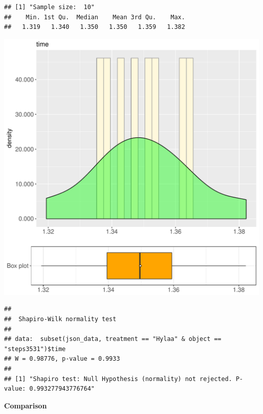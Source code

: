 \documentclass{article}\usepackage[]{graphicx}\usepackage[]{color}
\makeatletter
\def\maxwidth{ %
  \ifdim\Gin@nat@width>\linewidth
    \linewidth
  \else
    \Gin@nat@width
  \fi
}
\newenvironment{kframe}{%
 \def\at@end@of@kframe{}%
 \ifinner\ifhmode%
  \def\at@end@of@kframe{\end{minipage}}%
  \begin{minipage}{\columnwidth}%
 \fi\fi%
 \def\FrameCommand##1{\hskip\@totalleftmargin \hskip-\fboxsep
 \colorbox{shadecolor}{##1}\hskip-\fboxsep
     \hskip-\linewidth \hskip-\@totalleftmargin \hskip\columnwidth}%
 \MakeFramed {\advance\hsize-\width
   \@totalleftmargin\z@ \linewidth\hsize
   \@setminipage}}%
 {\par\unskip\endMakeFramed%
 \at@end@of@kframe}
\newenvironment{knitrout}{}{} %
\makeatother
\begin{document}
\begin{knitrout}
\color{fgcolor}\begin{kframe}
\begin{verbatim}
## [1] "Sample size:  10"
##    Min. 1st Qu.  Median    Mean 3rd Qu.    Max. 
##   1.319   1.340   1.350   1.350   1.359   1.382
\end{verbatim}
\end{kframe}
\includegraphics[width=\maxwidth]{figure/RH2_Hylaa_steps3531-1} 
\begin{kframe}\begin{verbatim}
## 
## 	Shapiro-Wilk normality test
## 
## data:  subset(json_data, treatment == "Hylaa" & object == "steps3531")$time
## W = 0.98776, p-value = 0.9933
## 
## [1] "Shapiro test: Null Hypothesis (normality) not rejected. P-value: 0.993277943776764"
\end{verbatim}
\end{kframe}
\end{knitrout}
  
 \textbf{Comparison}
  
\end{document}
